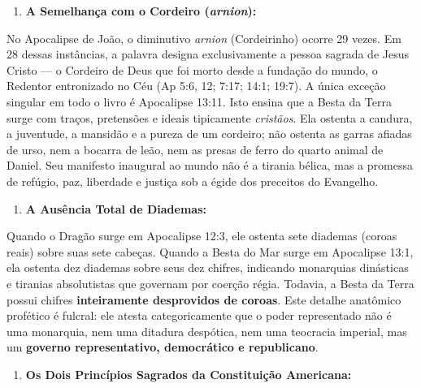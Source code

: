 \documentclass[11pt,a4paper,openany]{book}
\begin{document}
\begin{enumerate}
  \item \textbf{A Semelhança com o Cordeiro (\textit{arnion}):}
\end{enumerate}

No Apocalipse de João, o diminutivo \textit{arnion} (Cordeirinho) ocorre 29 vezes. Em 28 dessas instâncias, a palavra designa exclusivamente a pessoa sagrada de Jesus Cristo — o Cordeiro de Deus que foi morto desde a fundação do mundo, o Redentor entronizado no Céu (Ap 5:6, 12; 7:17; 14:1; 19:7). A única exceção singular em todo o livro é Apocalipse 13:11. Isto ensina que a Besta da Terra surge com traços, pretensões e ideais tipicamente \textit{cristãos}. Ela ostenta a candura, a juventude, a mansidão e a pureza de um cordeiro; não ostenta as garras afiadas de urso, nem a bocarra de leão, nem as presas de ferro do quarto animal de Daniel. Seu manifesto inaugural ao mundo não é a tirania bélica, mas a promessa de refúgio, paz, liberdade e justiça sob a égide dos preceitos do Evangelho.

\begin{enumerate}
  \item \textbf{A Ausência Total de Diademas:}
\end{enumerate}

Quando o Dragão surge em Apocalipse 12:3, ele ostenta sete diademas (coroas reais) sobre suas sete cabeças. Quando a Besta do Mar surge em Apocalipse 13:1, ela ostenta dez diademas sobre seus dez chifres, indicando monarquias dinásticas e tiranias absolutistas que governam por coerção régia. Todavia, a Besta da Terra possui chifres \textbf{inteiramente desprovidos de coroas}. Este detalhe anatômico profético é fulcral: ele atesta categoricamente que o poder representado não é uma monarquia, nem uma ditadura despótica, nem uma teocracia imperial, mas um \textbf{governo representativo, democrático e republicano}.

\begin{enumerate}
  \item \textbf{Os Dois Princípios Sagrados da Constituição Americana:}
\end{enumerate}
\end{document}
